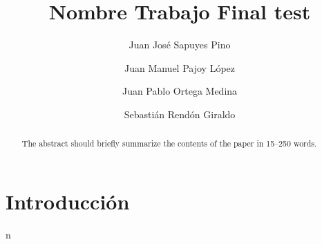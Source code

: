 \documentclass[runningheads]{llncs}
\begin{document}
%
\title{Nombre Trabajo Final test}
%
%
\author{Juan José Sapuyes Pino \and
    Juan Manuel Pajoy López \and
    Juan Pablo Ortega Medina \and
    Sebastián Rendón Giraldo}
%
%
%
\maketitle              %
%
\begin{abstract}
    The abstract should briefly summarize the contents of the paper in
    15--250 words.

\end{abstract}

\section{Introducción}

%
%
%
 n     

\end{document}

